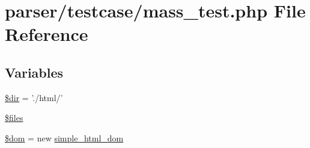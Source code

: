 \hypertarget{mass__test_8php}{\section{parser/testcase/mass\+\_\+test.php File Reference}
\label{mass__test_8php}
}
\subsection*{Variables}
\begin{DoxyCompactItemize}
\item 
\hyperlink{mass__test_8php_a1659f0a629d408e0f849dbe4ee061e62}{\$dir} = './html/'
\item 
\hyperlink{mass__test_8php_a9590b15215a21e9b42eb546aeef79704}{\$files}
\item 
\hyperlink{mass__test_8php_a46127a794280dd592812c25b62af34b0}{\$dom} = new \hyperlink{classsimple__html__dom}{simple\+\_\+html\+\_\+dom}
\end{DoxyCompactItemize}


